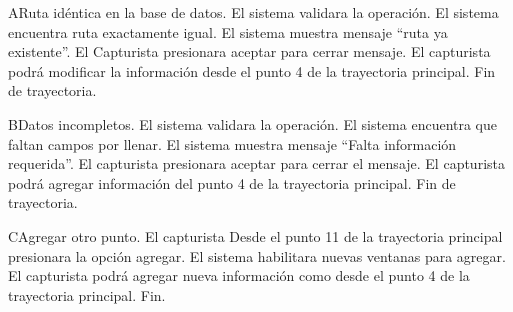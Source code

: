 \begin{UCtrayectoriaA}{A}{Ruta idéntica en la base de datos.}
	\UCpaso El sistema validara la operación.
	\UCpaso	El sistema encuentra ruta exactamente igual.
	\UCpaso	El sistema muestra mensaje “ruta ya existente”.
	\UCpaso	El Capturista presionara aceptar para cerrar mensaje.
	\UCpaso	El capturista podrá modificar la información desde el punto 4 de la trayectoria principal.
	\UCpaso	Fin de trayectoria.
\end{UCtrayectoriaA}

\begin{UCtrayectoriaA}{B}{Datos incompletos.}
	\UCpaso El sistema validara la operación.
	\UCpaso	El sistema encuentra que faltan campos por llenar.
	\UCpaso	El sistema muestra mensaje “Falta información requerida”.
	\UCpaso	El capturista presionara aceptar para cerrar el mensaje.
	\UCpaso	El capturista podrá agregar información del punto 4 de la trayectoria principal.
	\UCpaso	Fin de trayectoria.
\end{UCtrayectoriaA}

\begin{UCtrayectoriaA}{C}{Agregar otro punto.}
	\UCpaso El capturista Desde el punto 11 de la trayectoria principal presionara la opción agregar.
	\UCpaso	El sistema habilitara nuevas ventanas para agregar.
	\UCpaso	El capturista podrá agregar nueva información como desde el punto 4 de la trayectoria principal.
	\UCpaso	Fin.
\end{UCtrayectoriaA}
		
